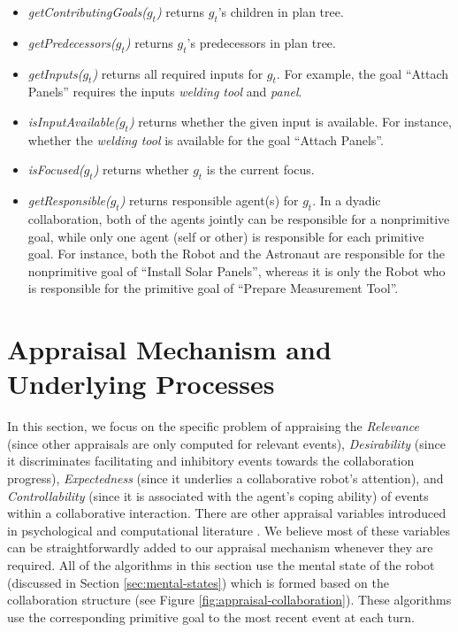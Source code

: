 \documentclass[12pt]{report}
\begin{document}
\begin{itemize}
  \item \textit{getContributingGoals($g_t$)} returns $g_t$'s children in plan
  tree.
  
  \item \textit{getPredecessors($g_t$)} returns $g_t$'s predecessors in plan
  tree.
  
  \item \textit{getInputs($g_t$)} returns all required inputs for $g_t$. For
  example, the goal ``Attach Panels'' requires the inputs \textit{welding tool}
  and \textit{panel}.
  
  \item \textit{isInputAvailable($g_t$)} returns whether the given input is
  available. For instance, whether the \textit{welding tool} is available for
  the goal ``Attach Panels''.
  
  
  \item \textit{isFocused($g_t$)} returns whether $g_t$ is the current focus.
  
  \item \textit{getResponsible($g_t$)} returns responsible agent(s) for $g_t$.
  In a dyadic collaboration, both of the agents jointly can be responsible for
  a nonprimitive goal, while only one agent (self or other) is responsible for
  each primitive goal. For instance, both the Robot and the Astronaut are
  responsible for the nonprimitive goal of ``Install Solar Panels'', whereas it
  is only the Robot who is responsible for the primitive goal of ``Prepare
  Measurement Tool''.
\end{itemize}

\section{Appraisal Mechanism and Underlying Processes}
\label{sec:appraisal}
In this section, we focus on the specific problem of appraising the
\textit{Relevance} (since other appraisals are only computed for relevant
events), \textit{Desirability} (since it discriminates facilitating and
inhibitory events towards the collaboration progress), \textit{Expectedness}
(since it underlies a collaborative robot's attention), and
\textit{Controllability} (since it is associated with the agent's coping
ability) of events within a collaborative interaction. There are other appraisal
variables introduced in psychological \cite{scherer:appraisal-processes} and
computational literature \cite{gratch:domain-independent}. We believe most of
these variables can be straightforwardly added to our appraisal mechanism
whenever they are required. All of the algorithms in this section use the mental
state of the robot (discussed in Section \ref{sec:mental-states}) which is
formed based on the collaboration structure (see Figure
\ref{fig:appraisal-collaboration}). These algorithms use the corresponding
primitive goal to the most recent event at each turn.
\end{document}
